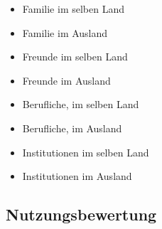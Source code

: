 \begin{enumerate}[resume]
		\begin{itemize}
		\item[\Circle] Familie im selben Land
        \item[\Circle] Familie im Ausland
        \item[\Circle] Freunde im selben Land
        \item[\Circle] Freunde im Ausland
        \item[\Circle] Berufliche, im selben Land
        \item[\Circle] Berufliche, im Ausland
        \item[\Circle] Institutionen im selben Land
        \item[\Circle] Institutionen im Ausland
		\end{itemize}
\end{enumerate}
 

\subsection*{Nutzungsbewertung}\label{App1:SectionNutzungsbewerung}

